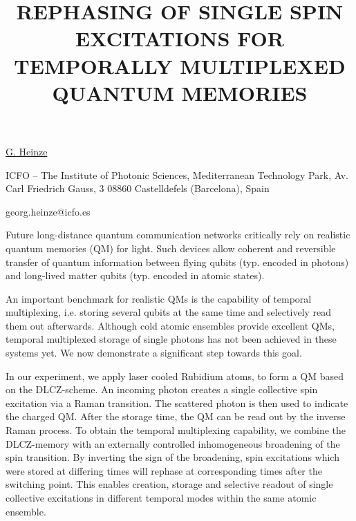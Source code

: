 \title{REPHASING OF SINGLE SPIN EXCITATIONS FOR TEMPORALLY MULTIPLEXED QUANTUM MEMORIES}

\underline{G. Heinze} 

{\normalsize{\vspace{-4mm}
ICFO -- The Institute of Photonic Sciences,
Mediterranean Technology Park,
Av. Carl Friedrich Gauss, 3
08860 Castelldefels (Barcelona), Spain

\email georg.heinze@icfo.es}}

Future long-distance quantum communication networks critically rely on realistic quantum memories (QM) for light. Such devices allow coherent and reversible transfer of quantum information between flying qubits (typ. encoded in photons) and long-lived matter qubits (typ. encoded in atomic states).

An important benchmark for realistic QMs is the capability of temporal multiplexing, i.e. storing several qubits at the same time and selectively read them out afterwards. Although cold atomic ensembles provide excellent QMs, temporal multiplexed storage of single photons has not been achieved in these systems yet. We now demonstrate a significant step towards this goal.

In our experiment, we apply laser cooled Rubidium atoms, to form a QM based on the DLCZ-scheme. An incoming photon creates a single collective spin excitation via a Raman transition. The scattered photon is then used to indicate the charged QM. After the storage time, the QM can be read out by the inverse Raman process. To obtain the temporal multiplexing capability, we combine the DLCZ-memory with an externally controlled inhomogeneous broadening of the spin transition. By inverting the sign of the broadening, spin excitations which were stored at differing times will rephase at corresponding times after the switching point. This enables creation, storage and selective readout of single collective excitations in different temporal modes within the same atomic ensemble.


\vspace{\baselineskip}
